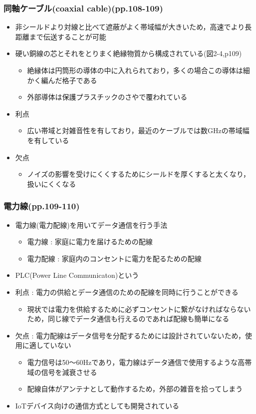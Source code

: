 \documentclass[a4paper]{ltjsarticle}
\begin{document}
		\subsubsection{同軸ケーブル(coaxial cable)(pp.108-109)}
			\begin{itemize}
				\item 非シールドより対線と比べて遮蔽がよく帯域幅が大きいため，高速でより長距離まで伝送することが可能
				\item 硬い銅線の芯とそれをとりまく絶縁物質から構成されている(図2-4,p109)
				\begin{itemize}
					\item 絶縁体は円筒形の導体の中に入れられており，多くの場合この導体は細かく編んだ格子である
					\item 外部導体は保護プラスチックのさやで覆われている
				\end{itemize}
				\item 利点
				\begin{itemize}
					\item 広い帯域と対雑音性を有しており，最近のケーブルでは数GHzの帯域幅を有している
				\end{itemize}
				\item 欠点
				\begin{itemize}
					\item ノイズの影響を受けにくくするためにシールドを厚くすると太くなり，扱いにくくなる
				\end{itemize}
			\end{itemize}
		\subsubsection{電力線(pp.109-110)}
			\begin{itemize}
				\item 電力線(電力配線)を用いてデータ通信を行う手法
				\begin{itemize}
					\item 電力線 : 家庭に電力を届けるための配線
					\item 電力配線 : 家庭内のコンセントに電力を配るための配線
				\end{itemize}
				\item PLC(Power Line Communicaton)という
				\item 利点 : 電力の供給とデータ通信のための配線を同時に行うことができる
				\begin{itemize}
					\item 現状では電力を供給するために必ずコンセントに繋がなければならないため，同じ線でデータ通信も行えるのであれば配線も簡単になる
				\end{itemize}
				\item 欠点 : 電力配線はデータ信号を分配するためには設計されていないため，使用に適していない
				\begin{itemize}
					\item 電力信号は50〜60\si{Hz}であり，電力線はデータ通信で使用するような高帯域の信号を減衰させる
					\item 配線自体がアンテナとして動作するため，外部の雑音を拾ってしまう
				\end{itemize}
				\item IoTデバイス向けの通信方式としても開発されている\cite{plc}
			\end{itemize}
\end{document}
